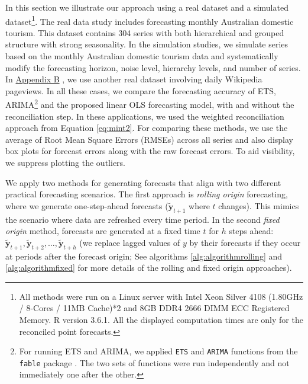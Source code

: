 \documentclass[11pt,a4paper,]{article}
\begin{document}
In this section we illustrate our approach using a real dataset and a simulated dataset\footnote{All methods were run on a Linux server with Intel Xeon Silver 4108 (1.80GHz / 8-Cores / 11MB Cache)*2 and 8GB DDR4 2666 DIMM ECC Registered Memory. R version 3.6.1. All the displayed computation times are only for the reconciled point forecasts.}. The real data study includes forecasting monthly Australian domestic tourism. This dataset contains 304 series with both hierarchical and grouped structure with strong seasonality. In the simulation studies, we simulate series based on the monthly Australian domestic tourism data and systematically modify the forecasting horizon, noise level, hierarchy levels, and number of series. In \protect\hyperlink{appendixB}{Appendix B} , we use another real dataset involving daily Wikipedia pageviews. In all these cases, we compare the forecasting accuracy of ETS, ARIMA\footnote{For running ETS and ARIMA, we applied \texttt{ETS} and \texttt{ARIMA} functions from the \texttt{fable} package \autocite{o2019fable}. The two sets of functions were run independently and not immediately one after the other.} and the proposed linear OLS forecasting model, with and without the reconciliation step. In these applications, we used the weighted reconciliation approach from Equation \eqref{eq:mint2}. For comparing these methods, we use the average of Root Mean Square Errors (RMSEs) across all series and also display box plots for forecast errors along with the raw forecast errors. To aid visibility, we suppress plotting the outliers.

We apply two methods for generating forecasts that align with two different practical forecasting scenarios. The first approach is \emph{rolling origin} forecasting, where we generate one-step-ahead forecasts (\(\tilde{\bm{y}}_{t+1}\) where \(t\) changes). This mimics the scenario where data are refreshed every time period. In the second \emph{fixed origin} method, forecasts are generated at a fixed time \(t\) for \(h\) steps ahead: \(\tilde{\bm{y}}_{t+1}, \tilde{\bm{y}}_{t+2},\dots, \tilde{\bm{y}}_{t+h}\) (we replace lagged values of \(y\) by their forecasts if they occur at periods after the forecast origin; See algorithms \ref{alg:algorithmrolling} and \ref{alg:algorithmfixed} for more details of the rolling and fixed origin approaches).
\end{document}
